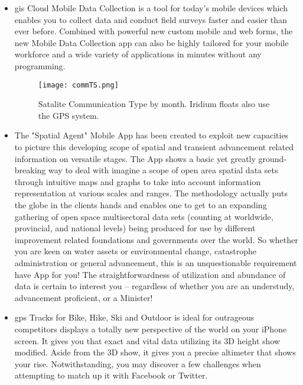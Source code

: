 \begin{itemize}
  \item \gls{gis} Cloud Mobile Data Collection is a tool for today’s mobile devices which enables you to collect data and conduct field surveys faster and easier than ever before. Combined with powerful new custom mobile and web forms, the new Mobile Data Collection app can also be highly tailored for your mobile workforce and a wide variety of applications in minutes without any programming.
  
  
  \begin{figure}[ht]
  \centering
  \begin{minipage}{4.5in}
    \texttt{[image: commTS.png]}
    \caption{ \label{fig:commTS} Satalite Communication Type by month. Iridium floats also use the GPS system.}
  \end{minipage}
\end{figure}
  
  \item The "Spatial Agent" Mobile App has been created to exploit new capacities to picture this developing scope of spatial and transient advancement related information on versatile stages. The App shows a basic yet greatly ground-breaking way to deal with imagine a scope of open area spatial data sets through intuitive maps and graphs to take into account information representation at various scales and ranges. The methodology actually puts the globe in the clients hands and enables one to get to an expanding gathering of open space multisectoral data sets (counting at worldwide, provincial, and national levels) being produced for use by different improvement related foundations and governments over the world. So whether you are keen on water assets or environmental change, catastrophe administration or general advancement, this is an unquestionable requirement have App for you! The straightforwardness of utilization and abundance of data is certain to interest you – regardless of whether you are an understudy, advancement proficient, or a Minister!
  
  
  \item \gls{gps} Tracks for Bike, Hike, Ski and Outdoor is ideal for outrageous competitors displays a totally new perspective of the world on your iPhone screen. It gives you that exact and vital data utilizing its 3D height show modified. Aside from the 3D show, it gives you a precise altimeter that shows your rise. Notwithstanding, you may discover a few challenges when attempting to match up it with Facebook or Twitter.
\end{itemize}

